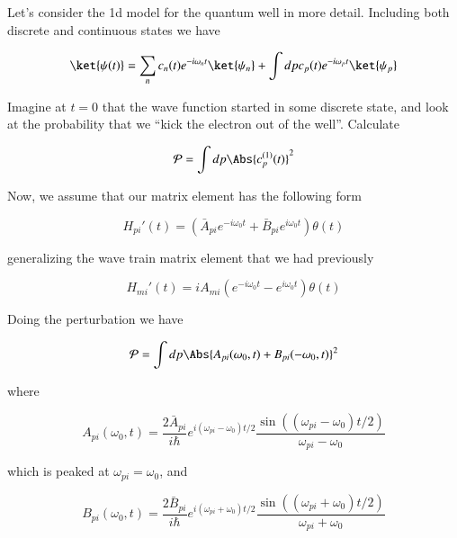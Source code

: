 Let's consider the 1d model for the quantum well in more detail.  Including both discrete and continuous states we have

\begin{equation}\label{eqn:qmTwoL10:150}
\ket{\psi(t)} = 
\sum_n c_n(t) e^{-i \omega_n t} \ket{\psi_n} + 
\int dp c_p(t) e^{-i \omega_p t} \ket{\psi_p} 
\end{equation}

Imagine at $t=0$ that the wave function started in some discrete state, and look at the probability that we ``kick the electron out of the well''.  Calculate

\begin{equation}\label{eqn:qmTwoL10:170}
\mathcal{P} = \int dp \Abs{c_p^{(1)}(t)}^2
\end{equation}

Now, we assume that our matrix element has the following form

\begin{equation}\label{eqn:qmTwoL10:190}
H_{pi}'(t) = \left( 
\bar{A}_{pi} e^{-i \omega_0 t}
+\bar{B}_{pi} e^{i \omega_0 t} \right) \theta(t)
\end{equation}

generalizing the wave train matrix element that we had previously

\begin{equation}\label{eqn:qmTwoL10:210}
H_{mi}'(t) = i A_{mi} \left( 
e^{-i \omega_0 t}
- e^{i \omega_0 t} \right) \theta(t)
\end{equation}

Doing the perturbation we have

\begin{equation}\label{eqn:qmTwoL10:230}
\mathcal{P} = \int dp \Abs{
A_{pi}(\omega_0, t)
+ B_{pi}(-\omega_0, t)
}^2
\end{equation}

where

\begin{equation}\label{eqn:qmTwoL10:250}
A_{pi}(\omega_0, t) = 
\frac{2 \bar{A}_{pi}}{i \hbar } 
e^{i (\omega_{pi} - \omega_0) t/2}
\frac{\sin((\omega_{pi} - \omega_0) t/2)}{
\omega_{pi} - \omega_0
}
\end{equation}

which is peaked at $\omega_{pi} = \omega_0$, and

\begin{equation}\label{eqn:qmTwoL10:270}
B_{pi}(\omega_0, t) = 
\frac{2 \bar{B}_{pi}}{i \hbar } 
e^{i (\omega_{pi} + \omega_0) t/2}
\frac{\sin((\omega_{pi} + \omega_0) t/2)}{
\omega_{pi} + \omega_0
}
\end{equation}

